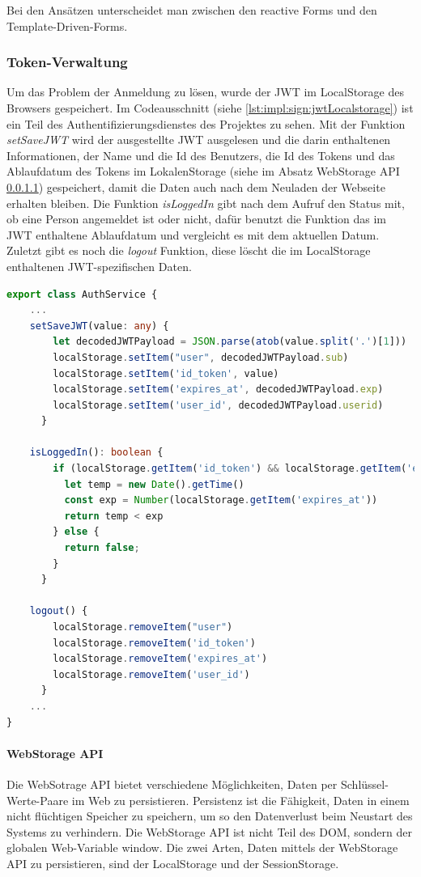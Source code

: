 Bei den Ansätzen unterscheidet man zwischen den reactive Forms und den Template-Driven-Forms.

\subsubsection{Token-Verwaltung}
Um das Problem der Anmeldung zu lösen, wurde der JWT im LocalStorage des Browsers gespeichert. Im Codeausschnitt (siehe \ref{lst:impl:sign:jwtLocalstorage}) ist ein Teil des Authentifizierungsdienstes des Projektes zu sehen. Mit der Funktion \emph{setSaveJWT} wird der ausgestellte JWT ausgelesen und die darin enthaltenen Informationen, der Name und die Id des Benutzers, die Id des Tokens und das Ablaufdatum des Tokens im LokalenStorage (siehe im Absatz WebStorage API \ref{par:impl:usermanagment:WebStorage}) gespeichert, damit die Daten auch nach dem Neuladen der Webseite erhalten bleiben. Die Funktion \emph{isLoggedIn} gibt nach dem Aufruf den Status mit, ob eine Person angemeldet ist oder nicht, dafür benutzt die Funktion das im JWT enthaltene Ablaufdatum und vergleicht es mit dem aktuellen Datum. Zuletzt gibt es noch die \emph{logout} Funktion, diese löscht die im LocalStorage enthaltenen JWT-spezifischen Daten.

\begin{lstlisting}[caption=auth.service.ts - JWT und Localstorage,label=lst:impl:sign:jwtLocalstorage,language=TypeScript ]
export class AuthService {
    ...
    setSaveJWT(value: any) {
        let decodedJWTPayload = JSON.parse(atob(value.split('.')[1]))
        localStorage.setItem("user", decodedJWTPayload.sub)
        localStorage.setItem('id_token', value)
        localStorage.setItem('expires_at', decodedJWTPayload.exp)
        localStorage.setItem('user_id', decodedJWTPayload.userid)
      }

    isLoggedIn(): boolean {
        if (localStorage.getItem('id_token') && localStorage.getItem('expires_at')) {
          let temp = new Date().getTime()
          const exp = Number(localStorage.getItem('expires_at'))
          return temp < exp
        } else {
          return false;
        }
      }

    logout() {
        localStorage.removeItem("user")
        localStorage.removeItem('id_token')
        localStorage.removeItem('expires_at')
        localStorage.removeItem('user_id')
      }
    ...
}        
\end{lstlisting}

\paragraph{WebStorage API}
\label{par:impl:usermanagment:WebStorage}
Die WebSotrage API bietet verschiedene Möglichkeiten, Daten per Schlüssel-Werte-Paare im Web zu persistieren. Persistenz ist die Fähigkeit, Daten in einem nicht flüchtigen Speicher zu speichern, um so den Datenverlust beim Neustart des Systems zu verhindern. Die WebStorage API ist nicht Teil des DOM, sondern der globalen Web-Variable window. Die zwei Arten, Daten mittels der WebStorage API zu persistieren, sind der LocalStorage und der SessionStorage.
\cite{WikiPersistenzDefinition} \cite{WebStorageAPI}


